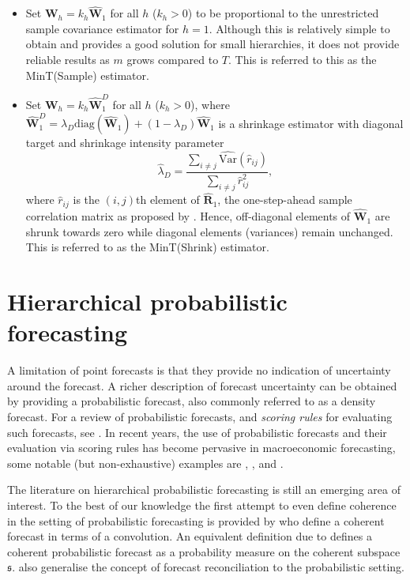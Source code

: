 \documentclass[a4paper, 11pt]{article}
\begin{document}
\begin{itemize}
	\item Set $\bm{W}_{h}=k_{h}\hat{\bm{W}}_{1}$ for all $h$ ($k_{h} > 0$) to be proportional to the unrestricted sample covariance estimator for $h=1$. Although this is relatively simple to obtain and provides a good solution for small hierarchies, it does not provide reliable results as $m$ grows compared to $T$. This is referred to this as the MinT(Sample) estimator.

	\item Set $\bm{W}_{h}=k_{h}\hat{\bm{W}}_{1}^D$ for all $h$ ($k_{h} > 0$), where $\hat{\bm{W}}^{D}_{1} = \lambda_{D} \text{diag}(\hat{\bm{W}}_{1}) + (1 - \lambda_{D})\hat{\bm{W}}_{1}$ is a shrinkage estimator with diagonal target and shrinkage intensity parameter
	$$
	\hat{\lambda}_{D} = \frac{\sum_{i \ne j}\hat{\text{Var}}(\hat{r}_{ij})}{\sum_{i \ne j}\hat{r}_{ij}^2},
	$$
	where $\hat{r}_{ij}$ is the $(i,j)$th element of $\hat{\bm{R}}_{1}$, the one-step-ahead sample correlation matrix as proposed by \citet{Schafer2005}. Hence, off-diagonal elements of $\hat{\bm{W}}_1$ are shrunk towards zero while diagonal elements (variances) remain unchanged. This is referred to as the MinT(Shrink) estimator.
\end{itemize}

\section{Hierarchical probabilistic forecasting}\label{sec:probforecasting}

A limitation of point forecasts is that they provide no indication of uncertainty around the forecast. A richer description of forecast uncertainty can be obtained by providing a probabilistic forecast, also commonly referred to as a density forecast. For a review of probabilistic forecasts, and \emph{scoring rules} for evaluating such forecasts, see \citep{Gneiting2014}. In recent years, the use of probabilistic forecasts and their evaluation via scoring rules has become pervasive in macroeconomic forecasting, some notable (but non-exhaustive) examples are \citet{GewAmi2010}, \citet{BilEtAl2013}, \citet{CarEtAl2015} and \citet{ClaRav2015}.

The literature on hierarchical probabilistic forecasting is still an emerging area of interest.  To the best of our knowledge the first attempt to even define coherence in the setting of probabilistic forecasting is provided by \citet{Taieb2017} who define a coherent forecast in terms of a convolution. An equivalent definition due to \citet{GamEtAl2018} defines a coherent probabilistic forecast as a probability measure on the coherent subspace $\mathfrak{s}$. \citet{GamEtAl2018} also generalise the concept of forecast reconciliation to the probabilistic setting.
\end{document}
